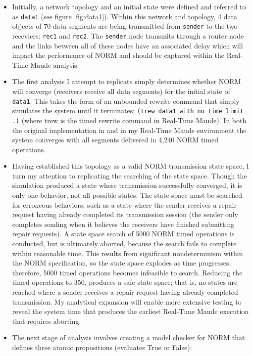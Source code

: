 \documentclass[10pt, journal]{IEEEtran}
\begin{document}
\begin{itemize}
	\item Initially, a network topology and an initial state were defined and referred to as \texttt{data1} (see figure \ref{fig:data1}). Within this network and topology, 4 data objects of 70 data segments are being transmitted from \texttt{sender} to the two receviers: \texttt{rec1} and \texttt{rec2}. The \texttt{sender} node transmits through a router node and the links between all of these nodes have an associated delay which will impact the performance of NORM and should be captured within the Real-Time Maude analysis.
	\item The first analysis I attempt to replicate simply determines whether NORM will converge (receivers receive all data segments) for the initial state of \texttt{data1}. This takes the form of an unbounded rewrite command that simply simulates the system until it terminates: \texttt{(trew data1 with no time limit .)} (where trew is the timed rewrite command in Real-Time Maude). In both the original implementation in \cite{Lien2004} and in my Real-Time Maude environment the system converges with all segments delivered in 4,240 NORM timed operations.
	\item Having established this topology as a valid NORM transmission state space, I turn my attention to replicating the searching of the state space. Though the simulation produced a state where transmission successfully converged, it is only one behavior, not all possible states. The state space must be searched for erroneous behaviors, such as a state where the sender receives a repair request having already completed its transmission session (the sender only completes sending when it believes the receivers have finished submitting repair requests). A state space search of 5000 NORM timed operations is conducted, but is ultimately aborted, because the search fails to complete within reasonable time. This results from significant nondeterminism within the NORM specification, so the state space explodes as time progresses; therefore, 5000 timed operations becomes infeasible to search. Reducing the timed operations to 350, produces a safe state space; that is, no states are reached where a sender receives a repair request having already completed transmission. My analytical expansion will enable more extensive testing to reveal the system time that produces the earliest Real-Time Maude execution that requires aborting.
	\item The next stage of analysis involves creating a model checker for NORM that defines three atomic propositions (evaluates True or False):

\end{itemize}
\end{document}
